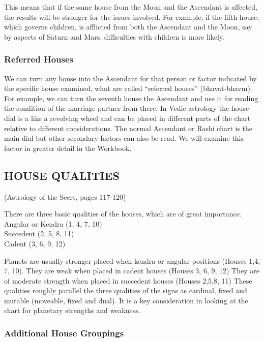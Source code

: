  

This means that if the same house from the Moon and the Ascendant is affected, the results will be stronger for the issues involved. For example, if the fifth house, which governs children, is afflicted from both the Ascendant and the Moon, say by aspects of Saturn and Mars, difficulties with children is more likely.

 

\subsubsection{Referred Houses}

 

We can turn any house into the Ascendant for that person or factor indicated by the specific house examined, what are called “referred houses” (bhavat-bhavm). For example, we can turn the seventh house the Ascendant and use it for reading the condition of the marriage partner from there. In Vedic astrology the house dial is a like a revolving wheel and can be placed in different parts of the chart relative to different considerations. The normal Ascendant or Rashi chart is the main dial but other secondary factors can also be read. We will examine this factor in greater detail in the Workbook.

 

\subsection{HOUSE QUALITIES} (Astrology of the Seers, pages 117-120)

 

There are three basic qualities of the houses, which are of great importance.\\
Angular or Kendra (1, 4, 7, 10)\\
Succedent  (2, 5, 8, 11)\\
Cadent (3, 6, 9, 12) 
 

Planets are usually stronger placed when kendra or angular positions (Houses 1,4, 7, 10). They are weak when placed in cadent houses (Houses 3, 6, 9, 12) They are of moderate strength when placed in  succedent houses (Houses 2,5,8, 11) These qualities roughly parallel the three qualities of the signs as cardinal, fixed and mutable (moveable, fixed and dual). It is a key consideration in looking at the chart for planetary strengths and weakness.

 

\subsubsection{Additional House Groupings}

